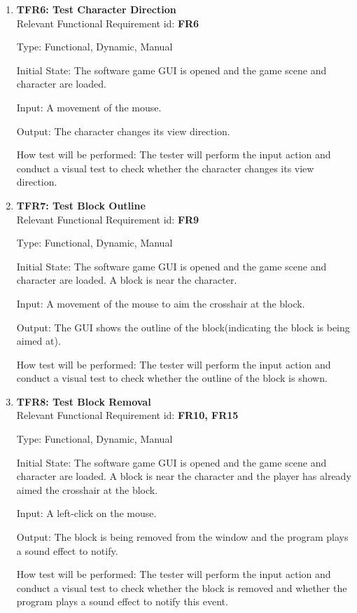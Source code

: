 \documentclass[12pt, titlepage]{article}
\begin{document}
\begin{enumerate}
\item{\textbf{TFR6: Test Character Direction}\\}
Relevant Functional Requirement id: \textbf{FR6}

Type: Functional, Dynamic, Manual

Initial State: The software game GUI is opened and the game scene and character are loaded.

Input: A movement of the mouse.

Output: The character changes its view direction.

How test will be performed: The tester will perform the input action and conduct a visual test to check whether the character changes its view direction.

\item{\textbf{TFR7: Test Block Outline}\\}\label{outline}
Relevant Functional Requirement id: \textbf{FR9}

Type: Functional, Dynamic, Manual

Initial State: The software game GUI is opened and the game scene and character are loaded. A block is near the character.

Input: A movement of the mouse to aim the crosshair at the block.

Output: The GUI shows the outline of the block(indicating the block is being aimed at).

How test will be performed: The tester will perform the input action and conduct a visual test to check whether the outline of the block is shown.

\item{\textbf{TFR8: Test Block Removal}\\}
Relevant Functional Requirement id: \textbf{FR10, FR15}

Type: Functional, Dynamic, Manual

Initial State: The software game GUI is opened and the game scene and character are loaded. A block is near the character and the player has already aimed the crosshair at the block.

Input: A left-click on the mouse.

Output: The block is being removed from the window and the program plays a sound effect to notify.

How test will be performed: The tester will perform the input action and conduct a visual test to check whether the block is removed and whether the program plays a sound effect to notify this event.


\end{enumerate}
\end{document}
